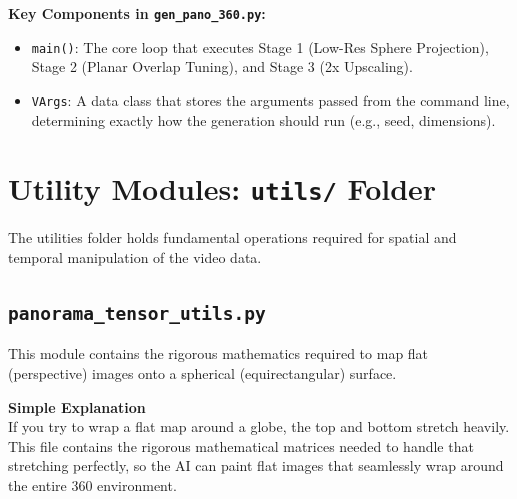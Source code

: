 \documentclass[11pt,a4paper]{article}
\begin{document}
\textbf{Key Components in \texttt{gen\_pano\_360.py}:}
\begin{itemize}
    \item \texttt{main()}: The core loop that executes Stage 1 (Low-Res Sphere Projection), Stage 2 (Planar Overlap Tuning), and Stage 3 (2x Upscaling). 
    \item \texttt{VArgs}: A data class that stores the arguments passed from the command line, determining exactly how the generation should run (e.g., seed, dimensions).
\end{itemize}


\section{Utility Modules: \texttt{utils/} Folder}
The utilities folder holds fundamental operations required for spatial and temporal manipulation of the video data.

\subsection{\texttt{panorama\_tensor\_utils.py}}
This module contains the rigorous mathematics required to map flat (perspective) images onto a spherical (equirectangular) surface.

\begin{simplebox}
\textbf{Simple Explanation} \\
If you try to wrap a flat map around a globe, the top and bottom stretch heavily. This file contains the rigorous mathematical matrices needed to handle that stretching perfectly, so the AI can paint flat images that seamlessly wrap around the entire 360 environment.
\end{simplebox}
\end{document}
